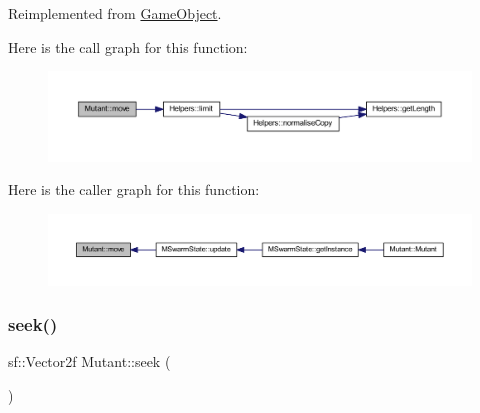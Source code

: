Reimplemented from \hyperlink{class_game_object_abebe08f70e334c52b8bf052b6ef8c6f3}{Game\+Object}.

Here is the call graph for this function\+:
\nopagebreak
\begin{figure}[H]
\begin{center}
\leavevmode
\includegraphics[width=350pt]{class_mutant_a5f5208a68bebe2cd3773f771a18e2992_cgraph}
\end{center}
\end{figure}
Here is the caller graph for this function\+:
\nopagebreak
\begin{figure}[H]
\begin{center}
\leavevmode
\includegraphics[width=350pt]{class_mutant_a5f5208a68bebe2cd3773f771a18e2992_icgraph}
\end{center}
\end{figure}
\mbox{\label{class_mutant_a5cdfb629154531e8f010930b072e14cc}} 
\subsubsection{\texorpdfstring{seek()}{seek()}}
{\footnotesize\ttfamily sf\+::\+Vector2f Mutant\+::seek (\begin{DoxyParamCaption}{ }\end{DoxyParamCaption})}

